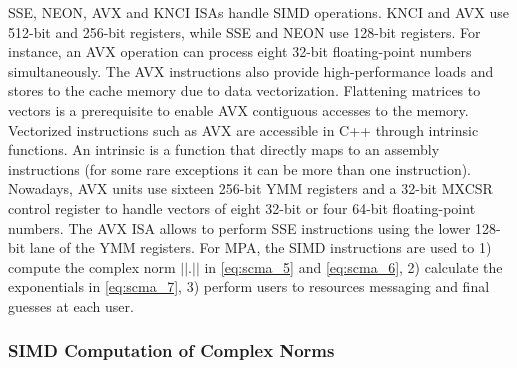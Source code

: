 SSE, NEON, AVX and KNCI ISAs handle SIMD operations. KNCI and AVX use 512-bit
and 256-bit registers, while SSE and NEON use 128-bit registers. For instance,
an AVX operation can process eight 32-bit floating-point numbers simultaneously.
The AVX instructions also provide high-performance loads and stores to the cache
memory due to data vectorization. Flattening matrices to vectors is a
prerequisite to enable AVX contiguous accesses to the memory. Vectorized
instructions such as AVX are accessible in C++ through intrinsic functions. An
intrinsic is a function that directly maps to an assembly instructions (for some
rare exceptions it can be more than one instruction). Nowadays, AVX units use
sixteen 256-bit YMM registers and a 32-bit MXCSR control register to handle
vectors of eight 32-bit or four 64-bit floating-point numbers. The AVX ISA
allows to perform SSE instructions using the lower 128-bit lane of the YMM
registers. For MPA, the SIMD instructions are used to 1) compute the complex
norm $||.||$ in \eqref{eq:scma_5} and \eqref{eq:scma_6}, 2) calculate the
exponentials in \eqref{eq:scma_7}, 3) perform users to resources messaging and
final guesses at each user.

\subsubsection{SIMD Computation of Complex Norms}

